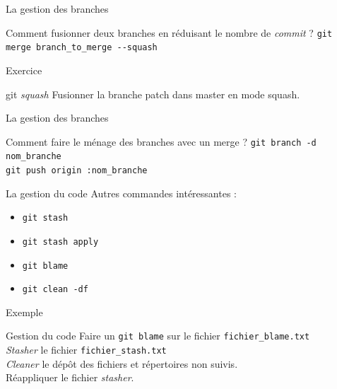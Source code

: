 \documentclass[11pt]{beamer}
\begin{document}
\begin{frame}[fragile]{La gestion des branches}
	\begin{block}{Comment fusionner deux branches en réduisant le nombre de \textit{commit} ?}
		\verb|git merge branch_to_merge --squash|
	\end{block}
\end{frame}

\begin{frame}[fragile]{Exercice}
	\begin{block}{git \textit{squash}}
		Fusionner la branche patch dans master en mode squash.
	\end{block}
\end{frame}

\begin{frame}[fragile]{La gestion des branches}
	\begin{block}{Comment faire le ménage des branches avec un merge ?}
		\verb|git branch -d nom_branche|\\
		\verb|git push origin :nom_branche|
	\end{block}
\end{frame}

\begin{frame}[fragile]{La gestion du code}
	Autres commandes intéressantes :
	\begin{itemize}
		\item \verb|git stash|
		\item \verb|git stash apply|
		\item \verb|git blame|
		\item \verb|git clean -df|
	\end{itemize}
\end{frame}

\begin{frame}[fragile]{Exemple}
	\begin{block}{Gestion du code}
		Faire un \verb|git blame| sur le fichier \verb|fichier_blame.txt|\\
		\textit{Stasher} le fichier \verb|fichier_stash.txt|\\
		\textit{Cleaner} le dépôt des fichiers et répertoires non suivis. \\
		Réappliquer le fichier \textit{stasher}.
	\end{block}
\end{frame}
\end{document}
